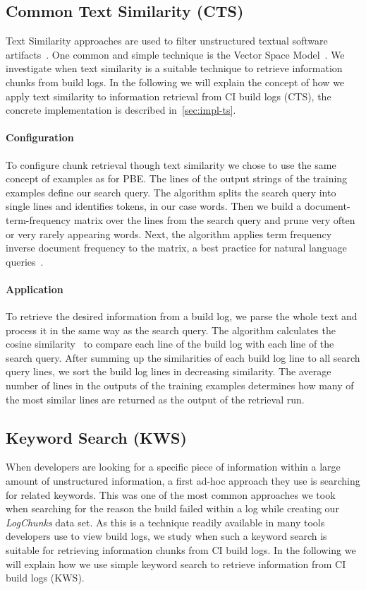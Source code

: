 \documentclass[\myrootdir/main.tex]{subfiles}
\begin{document}
\subsection{Common Text Similarity (CTS)}
\label{sec:expl-ts}
Text Similarity approaches are used to filter unstructured textual software artifacts~\cite{runeson2007detection,marcus2005recovery,antoniol2002recovering,mccarey2006recommending}.
One common and simple technique is the Vector Space Model~\cite{schutze2008introduction}.
We investigate when text similarity is a suitable technique to retrieve information chunks from build logs.
In the following we will explain the concept of how we apply text similarity to information retrieval from CI build logs (CTS), the concrete implementation is described in~\ref{sec:impl-ts}.

\paragraph{Configuration}
To configure chunk retrieval though text similarity we chose to use the same concept of examples as for PBE\@.
The lines of the output strings of the training examples define our search query.
The algorithm splits the search query into single lines and identifies tokens, in our case words.
Then we build a document-term-frequency matrix over the lines from the search query and prune very often or very rarely appearing words.
Next, the algorithm applies term frequency inverse document frequency to the matrix, a best practice for natural language queries~\cite{lee1997document}.

\paragraph{Application}
To retrieve the desired information from a build log, we parse the whole text and process it in the same way as the search query.
The algorithm calculates the cosine similarity~\cite{korenius2007principal} to compare each line of the build log with each line of the search query.
After summing up the similarities of each build log line to all search query lines, we sort the build log lines in decreasing similarity.
The average number of lines in the outputs of the training examples determines how many of the most similar lines are returned as the output of the retrieval run.

\subsection{Keyword Search (KWS)}
\label{sec:expl-skws}
When developers are looking for a specific piece of information within a large amount of unstructured information, a first ad-hoc approach they use is searching for related keywords.
This was one of the most common approaches we took when searching for the reason the build failed within a log while creating our \emph{LogChunks} data set.
As this is a technique readily available in many tools developers use to view build logs, we study when such a keyword search is suitable for retrieving information chunks from CI build logs.
In the following we will explain how we use simple keyword search to retrieve information from CI build logs (KWS).
\end{document}
